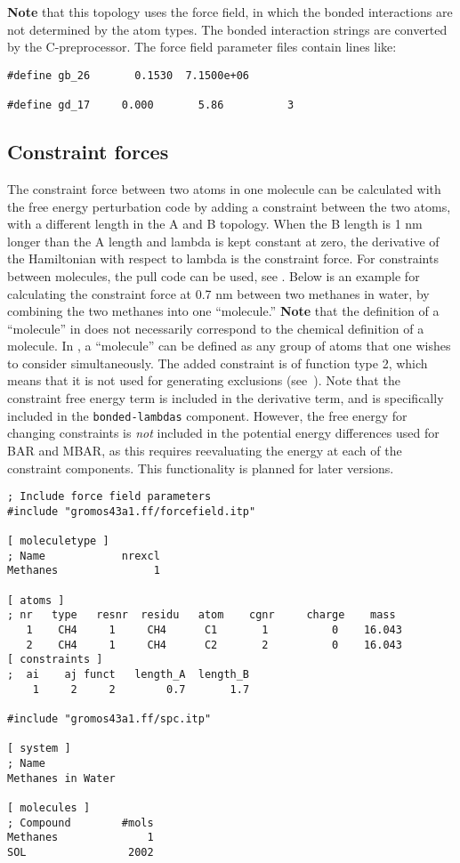 {\bf Note} that this topology uses the  force field, in which the bonded
interactions are not determined by the atom types. The bonded interaction
strings are converted by the C-preprocessor. The force field parameter
files contain lines like:

{\small
\begin{verbatim}
#define gb_26       0.1530  7.1500e+06

#define gd_17     0.000       5.86          3
\end{verbatim}}

\subsection{Constraint forces}
\label{subsec:constraintforce}
The constraint force between two atoms in one molecule can be calculated
with the free energy perturbation code by adding a constraint between the
two atoms, with a different length in the A and B topology. When the B length
is 1 nm longer than the A length and lambda is kept constant at zero,
the derivative of the Hamiltonian with respect to lambda is the constraint
force. For constraints between molecules, the pull code can be used,
see .
Below is an example for calculating the constraint force at 0.7 nm
between two methanes in water, by combining the two methanes into one ``molecule.''
{\bf Note} that the definition of a ``molecule'' in {\gromacs} does not necessarily
correspond to the chemical definition of a molecule.  In {\gromacs}, a ``molecule''
can be defined as any group of atoms that one wishes to consider simultaneously.
The added constraint is of function type 2, which means that it is not
used for generating exclusions (see~). 
Note that the constraint free energy term is included in the derivative term, and is
specifically included in the {\tt bonded-lambdas} component. However, the free
energy for changing constraints is {\em not} included in the potential energy
differences used for BAR and MBAR, as this requires reevaluating the energy at
each of the constraint components.  This functionality is planned for later versions.\\

{\small
\begin{verbatim}
; Include force field parameters
#include "gromos43a1.ff/forcefield.itp"

[ moleculetype ]
; Name            nrexcl
Methanes               1

[ atoms ]
; nr   type   resnr  residu   atom    cgnr     charge    mass
   1    CH4     1     CH4      C1       1          0    16.043
   2    CH4     1     CH4      C2       2          0    16.043
[ constraints ]
;  ai    aj funct   length_A  length_B
    1     2     2        0.7       1.7

#include "gromos43a1.ff/spc.itp"

[ system ]
; Name
Methanes in Water

[ molecules ]
; Compound        #mols
Methanes              1
SOL                2002
\end{verbatim}}

